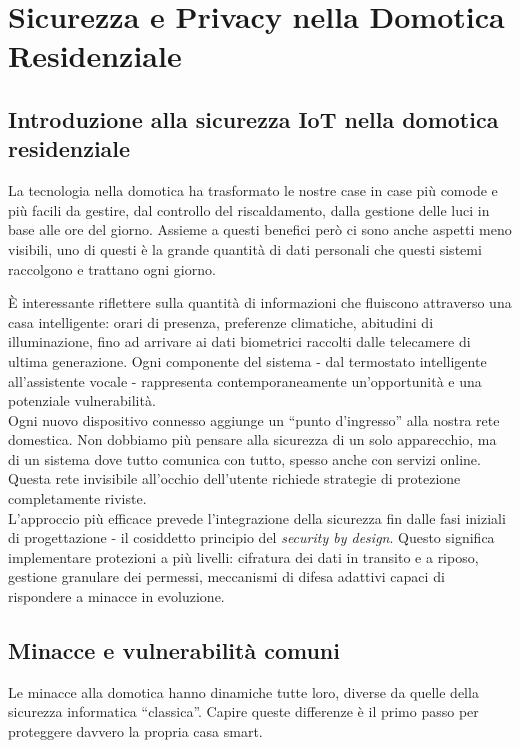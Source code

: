 \chapter{Sicurezza e Privacy nella Domotica Residenziale}

\section{Introduzione alla sicurezza IoT nella domotica residenziale}

La tecnologia nella domotica ha trasformato le nostre case in case più comode e più facili da gestire, dal controllo del riscaldamento, dalla gestione delle luci in base alle ore del giorno. Assieme a questi benefici però ci sono anche aspetti meno visibili, uno di questi è la grande quantità di dati personali che questi sistemi raccolgono e trattano ogni giorno.

È interessante riflettere sulla quantità di informazioni che fluiscono attraverso una casa intelligente: orari di presenza, preferenze climatiche, abitudini di illuminazione, fino ad arrivare ai dati biometrici raccolti dalle telecamere di ultima generazione. Ogni componente del sistema - dal termostato intelligente all'assistente vocale - rappresenta contemporaneamente un'opportunità e una potenziale vulnerabilità.\\

Ogni nuovo dispositivo connesso aggiunge un “punto d’ingresso” alla nostra rete domestica. Non dobbiamo più pensare alla sicurezza di un solo apparecchio, ma di un sistema dove tutto comunica con tutto, spesso anche con servizi online. Questa rete invisibile all’occhio dell’utente richiede strategie di protezione completamente riviste.\\

L'approccio più efficace prevede l'integrazione della sicurezza fin dalle fasi iniziali di progettazione - il cosiddetto principio del \textit{security by design}. Questo significa implementare protezioni a più livelli: cifratura dei dati in transito e a riposo, gestione granulare dei permessi, meccanismi di difesa adattivi capaci di rispondere a minacce in evoluzione.

\section{Minacce e vulnerabilità comuni}

Le minacce alla domotica hanno dinamiche tutte loro, diverse da quelle della sicurezza informatica “classica”. Capire queste differenze è il primo passo per proteggere davvero la propria casa smart.

